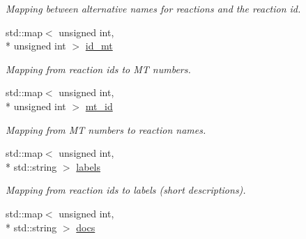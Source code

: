 \begin{DoxyCompactItemize}
\begin{DoxyCompactList}\small\item\em Mapping between alternative names for reactions and the reaction id. \end{DoxyCompactList}\item 
\hypertarget{namespacepyne_1_1rxname_a94ff01a63e221db69f259fa48616d3d5}{std\+::map$<$ unsigned int, \\*
unsigned int $>$ \hyperlink{namespacepyne_1_1rxname_a94ff01a63e221db69f259fa48616d3d5}{id\+\_\+mt}}\label{namespacepyne_1_1rxname_a94ff01a63e221db69f259fa48616d3d5}

\begin{DoxyCompactList}\small\item\em Mapping from reaction ids to M\+T numbers. \end{DoxyCompactList}\item 
\hypertarget{namespacepyne_1_1rxname_aca6dede953b1e7c1400ea23d40dce88c}{std\+::map$<$ unsigned int, \\*
unsigned int $>$ \hyperlink{namespacepyne_1_1rxname_aca6dede953b1e7c1400ea23d40dce88c}{mt\+\_\+id}}\label{namespacepyne_1_1rxname_aca6dede953b1e7c1400ea23d40dce88c}

\begin{DoxyCompactList}\small\item\em Mapping from M\+T numbers to reaction names. \end{DoxyCompactList}\item 
\hypertarget{namespacepyne_1_1rxname_a17fd6738dc8fcc8d08f3496926738364}{std\+::map$<$ unsigned int, \\*
std\+::string $>$ \hyperlink{namespacepyne_1_1rxname_a17fd6738dc8fcc8d08f3496926738364}{labels}}\label{namespacepyne_1_1rxname_a17fd6738dc8fcc8d08f3496926738364}

\begin{DoxyCompactList}\small\item\em Mapping from reaction ids to labels (short descriptions). \end{DoxyCompactList}\item 
\hypertarget{namespacepyne_1_1rxname_a1fcbb2b6dcf86e49cc70c4dfabf409ef}{std\+::map$<$ unsigned int, \\*
std\+::string $>$ \hyperlink{namespacepyne_1_1rxname_a1fcbb2b6dcf86e49cc70c4dfabf409ef}{docs}}\label{namespacepyne_1_1rxname_a1fcbb2b6dcf86e49cc70c4dfabf409ef}


\end{DoxyCompactItemize}
